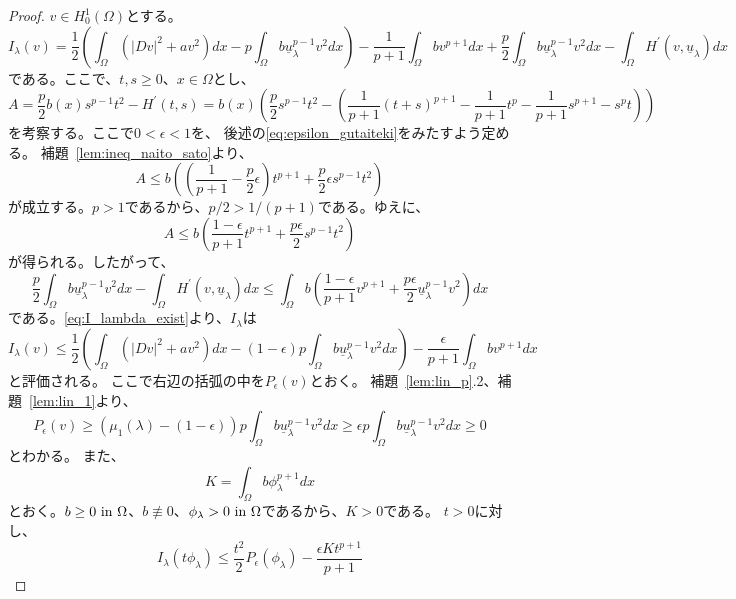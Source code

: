 \begin{proof}
 $v \in H^1_0(\Omega)$とする。
 \begin{equation}
  I_\lambda (v) = \frac{1}{2} \left( \int_\Omega \left( \lvert Dv
                                                  \rvert^2 + a v^2
                                                 \right) dx - p
  \int_\Omega b \underline{u}_\lambda^{p-1} v^2 dx \right) -
  \frac{1}{p+1} \int_\Omega b v^{p+1} dx + \frac{p}{2} \int_\Omega b
  \underline{u}_\lambda ^{p-1} v^2 dx - \int_\Omega H^\prime (v,
  \underline{u}_\lambda) dx \label{eq:I_lambda_exist}
 \end{equation}
 である。ここで、$t, s \geq 0$、$x \in \Omega$とし、
 \[
 A = \frac{p}{2} b(x) s^{p-1} t^2 - H^\prime(t, s) = b(x) \left(
 \frac{p}{2} s^{p-1} t^2 - \left(\frac{1}{p+1} (t+s)^{p+1} -
 \frac{1}{p+1}t^p - \frac{1}{p+1} s^{p+1} - s^p t \right) \right)
 \]
 を考察する。ここで$0 < \epsilon < 1$を、
 後述の\eqref{eq:epsilon_gutaiteki}をみたすよう定める。
 補題~\ref{lem:ineq_naito_sato}より、
 \[
 A \leq b \left( \left( \frac{1}{p+1} - \frac{p}{2} \epsilon \right)
 t^{p+1} + \frac{p}{2}\epsilon s^{p-1} t^2 \right)
 \]
 が成立する。$p > 1$であるから、$p/2 > 1/(p+1)$である。ゆえに、
 \[
 A \leq b \left( \frac{1 - \epsilon}{p+1} t^{p+1} +
 \frac{p\epsilon}{2} s^{p-1} t^2 \right)
 \]
 が得られる。したがって、
 \[
 \frac{p}{2} \int_\Omega b \underline{u}_\lambda^{p-1} v^2 dx -
 \int_\Omega H^\prime (v, \underline{u}_\lambda) dx \leq \int_\Omega b
 \left( \frac{1-\epsilon}{p+1} v^{p+1} + \frac{p \epsilon}{2}
 \underline{u}_\lambda ^{p-1} v^2 \right) dx
 \]
 である。\eqref{eq:I_lambda_exist}より、$I_\lambda$は
 \[
 I_\lambda(v) \leq \frac{1}{2} \left( \int_\Omega \left( \lvert Dv
 \rvert^{2} + a v^2\right)dx - (1 -\epsilon)p \int_\Omega b
 \underline{u}_\lambda^{p-1} v^2 dx \right) - \frac{\epsilon}{p+1}
 \int_\Omega bv^{p+1} dx
\]
 と評価される。
 ここで右辺の括弧の中を$P_\epsilon(v)$とおく。
 補題~\ref{lem:lin_p}.2、補題~\ref{lem:lin_1}より、
 \[
  P_\epsilon(v) \geq \left(\mu_1(\lambda) - (1 - \epsilon) \right) p
 \int_\Omega b
 \underline{u}_\lambda^{p-1} v^2 dx \geq \epsilon p 
 \int_\Omega b
 \underline{u}_\lambda^{p-1} v^2 dx \geq 0
 \]
 とわかる。
 また、
 \begin{equation}
  K = \int_\Omega b \phi_\lambda^{p+1} dx \label{eq:intbphi}
 \end{equation}
 とおく。$b \geq 0 ~\text{in}~ \Omega$、$b \not\equiv 0$、$\phi_\lambda > 0
 ~\text{in}~ \Omega$であるから、$K > 0$である。
 $t > 0$に対し、
 \[
 I_\lambda (t \phi_\lambda) \leq \frac{t^2}{2} P_\epsilon
 (\phi_\lambda) - \frac{\epsilon K t^{p+1}}{p+1}
\]
\end{proof}
